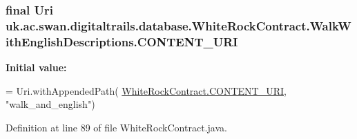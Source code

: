 \hypertarget{classuk_1_1ac_1_1swan_1_1digitaltrails_1_1database_1_1_white_rock_contract_1_1_walk_with_english_descriptions_a94897cd53c4acae52063c420d9276d12}{
\subsubsection[{C\+O\+N\+T\+E\+N\+T\+\_\+\+U\+R\+I}]{\setlength{\rightskip}{0pt plus 5cm}final Uri uk.\+ac.\+swan.\+digitaltrails.\+database.\+White\+Rock\+Contract.\+Walk\+With\+English\+Descriptions.\+C\+O\+N\+T\+E\+N\+T\+\_\+\+U\+R\+I\hspace{0.3cm}{\ttfamily [static]}}}\label{classuk_1_1ac_1_1swan_1_1digitaltrails_1_1database_1_1_white_rock_contract_1_1_walk_with_english_descriptions_a94897cd53c4acae52063c420d9276d12}
{\bfseries Initial value\+:}
\begin{DoxyCode}
= Uri.withAppendedPath(
                \hyperlink{classuk_1_1ac_1_1swan_1_1digitaltrails_1_1database_1_1_white_rock_contract_abfe96759bfe16773a98099536eef2306}{WhiteRockContract.CONTENT\_URI}, \textcolor{stringliteral}{"walk\_and\_english"})
\end{DoxyCode}


Definition at line 89 of file White\+Rock\+Contract.\+java.

